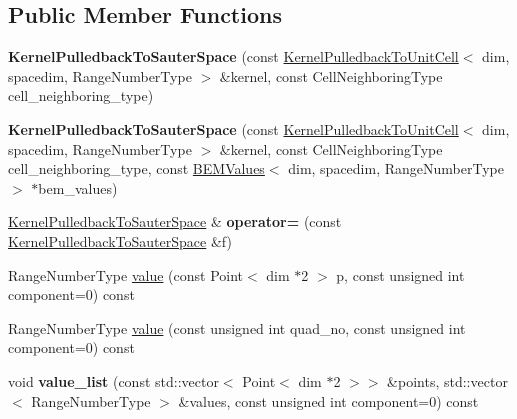 \subsection*{Public Member Functions}
\begin{DoxyCompactItemize}
\item 
\mbox{\label{classLaplaceBEM_1_1KernelPulledbackToSauterSpace_a84d8a1b230bab697000f16e021c671a4}} 
{\bfseries Kernel\+Pulledback\+To\+Sauter\+Space} (const \hyperlink{classLaplaceBEM_1_1KernelPulledbackToUnitCell}{Kernel\+Pulledback\+To\+Unit\+Cell}$<$ dim, spacedim, Range\+Number\+Type $>$ \&kernel, const Cell\+Neighboring\+Type cell\+\_\+neighboring\+\_\+type)
\item 
\mbox{\label{classLaplaceBEM_1_1KernelPulledbackToSauterSpace_ae5d75fcb617d831107a8cd2151e6cb3a}} 
{\bfseries Kernel\+Pulledback\+To\+Sauter\+Space} (const \hyperlink{classLaplaceBEM_1_1KernelPulledbackToUnitCell}{Kernel\+Pulledback\+To\+Unit\+Cell}$<$ dim, spacedim, Range\+Number\+Type $>$ \&kernel, const Cell\+Neighboring\+Type cell\+\_\+neighboring\+\_\+type, const \hyperlink{classLaplaceBEM_1_1BEMValues}{B\+E\+M\+Values}$<$ dim, spacedim, Range\+Number\+Type $>$ $\ast$bem\+\_\+values)
\item 
\mbox{\label{classLaplaceBEM_1_1KernelPulledbackToSauterSpace_a6c0754fea80b064e1b8b7246634d0cb9}} 
\hyperlink{classLaplaceBEM_1_1KernelPulledbackToSauterSpace}{Kernel\+Pulledback\+To\+Sauter\+Space} \& {\bfseries operator=} (const \hyperlink{classLaplaceBEM_1_1KernelPulledbackToSauterSpace}{Kernel\+Pulledback\+To\+Sauter\+Space} \&f)
\item 
Range\+Number\+Type \hyperlink{classLaplaceBEM_1_1KernelPulledbackToSauterSpace_a27d5e8b248c5060198b9137162d77c0c}{value} (const Point$<$ dim $\ast$2 $>$ p, const unsigned int component=0) const
\item 
Range\+Number\+Type \hyperlink{classLaplaceBEM_1_1KernelPulledbackToSauterSpace_a3f811601a201e4c68cd1a9392866706b}{value} (const unsigned int quad\+\_\+no, const unsigned int component=0) const
\item 
\mbox{\label{classLaplaceBEM_1_1KernelPulledbackToSauterSpace_aed5c1c302117781dd5c0460cfc8a9392}} 
void {\bfseries value\+\_\+list} (const std\+::vector$<$ Point$<$ dim $\ast$2 $>$$>$ \&points, std\+::vector$<$ Range\+Number\+Type $>$ \&values, const unsigned int component=0) const
\end{DoxyCompactItemize}
